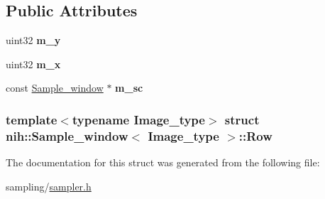\subsection*{\-Public \-Attributes}
\begin{DoxyCompactItemize}
\item 
\hypertarget{structnih_1_1_sample__window_1_1_row_a90d3646b1784ebf697f0cafe520bb418}{
uint32 {\bfseries m\-\_\-y}}
\label{structnih_1_1_sample__window_1_1_row_a90d3646b1784ebf697f0cafe520bb418}

\item 
\hypertarget{structnih_1_1_sample__window_1_1_row_aa8d8f88071a2cf60e812d3230ccdff28}{
uint32 {\bfseries m\-\_\-x}}
\label{structnih_1_1_sample__window_1_1_row_aa8d8f88071a2cf60e812d3230ccdff28}

\item 
\hypertarget{structnih_1_1_sample__window_1_1_row_af608b835945357afe719acadec9dd620}{
const \hyperlink{classnih_1_1_sample__window}{\-Sample\-\_\-window} $\ast$ {\bfseries m\-\_\-sc}}
\label{structnih_1_1_sample__window_1_1_row_af608b835945357afe719acadec9dd620}

\end{DoxyCompactItemize}
\subsubsection*{template$<$typename Image\-\_\-type$>$ struct nih\-::\-Sample\-\_\-window$<$ Image\-\_\-type $>$\-::\-Row}



\-The documentation for this struct was generated from the following file\-:\begin{DoxyCompactItemize}
\item 
sampling/\hyperlink{sampler_8h}{sampler.\-h}\end{DoxyCompactItemize}
